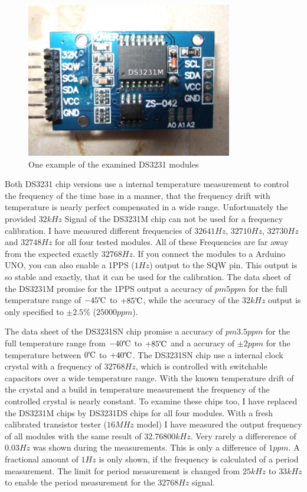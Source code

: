 \begin{figure}[H]
\centering
\includegraphics[width=9cm]{../PNG/DS3231M.jpg}
\caption{One example of the examined DS3231 modules}
\label{fig:DS3231M}
\end{figure}

Both DS3231 chip versions use a internal temperature measurement to control the frequency of
the time base in a manner, that the frequency drift with temperature is nearly
perfect compensated in a wide range.
Unfortunately the provided \(32kHz\) Signal of the DS3231M chip can not be used for a
frequency calibration. I have measured different frequencies of \(32641Hz\), \(32710Hz\),
\(32730Hz\) and \(32748Hz\) for all four tested modules. 
All of these Frequencies are far away from the expected exactly \(32768Hz\).
If you connect the modules to a Arduino UNO, you can also enable a 1PPS (\(1Hz\)) output
to the SQW pin.
This output is so stable and exactly, that it can be used for the calibration.
The data sheet of the DS3231M promise for the 1PPS output a accuracy of \(pm 5ppm\) for
the full temperature range of \(-45\celsius\) to \(+85\celsius\), while the accuracy of the
\(32kHz\) output is only specified to \(\pm 2.5\%\) (\(25000ppm\)).

The data sheet of the DS3231SN chip promise a accuracy of \(pm 3.5ppm\) for the full
temperature range from \(-40\celsius\) to \(+85\celsius\) and a accuracy of \(\pm 2ppm\)
for the temperature between \(0\celsius\) to \(+40\celsius\).
The DS3231SN chip use a internal clock crystal with a frequency of \(32768Hz\), which is
controlled with switchable capacitors over a wide temperature range.
With the known temperature drift of the crystal and a build in temperature measurement
the frequency of the controlled crystal is nearly constant.
To examine these chips too, I have replaced the DS3231M chips by DS3231DS chips for
all four modules.
With a fresh calibrated transistor tester (\(16MHz\) model) I have measured the output frequency of all
modules with the same result of \(32.76800kHz\). Very rarely a differerence of \(0.03Hz\)
was shown during the measurements. This is only a difference of \(1ppm\).
A fractional amount of \(1Hz\) is only shown, if the frequency is calculated of a period measurement.
The limit for period measurement is changed from \(25kHz\) to \(33kHz\) to enable
the period measurement for the \(32768Hz\) signal.

